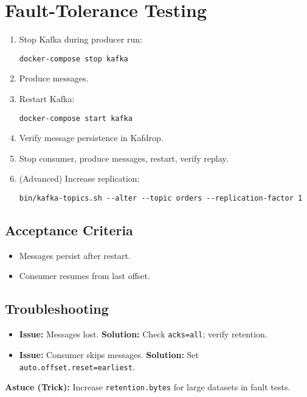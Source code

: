 \documentclass[12pt,a4paper]{report}
\begin{document}
\section{Fault-Tolerance Testing}
\begin{enumerate}
    \item Stop Kafka during producer run:
    \begin{lstlisting}
docker-compose stop kafka
    \end{lstlisting}
    \item Produce messages.
    \item Restart Kafka:
    \begin{lstlisting}
docker-compose start kafka
    \end{lstlisting}
    \item Verify message persistence in Kafdrop.
    \item Stop consumer, produce messages, restart, verify replay.
    \item (Advanced) Increase replication:
    \begin{lstlisting}
bin/kafka-topics.sh --alter --topic orders --replication-factor 1
    \end{lstlisting}
\end{enumerate}

\subsection{Acceptance Criteria}
\begin{itemize}
    \item Messages persist after restart.
    \item Consumer resumes from last offset.
\end{itemize}

\subsection{Troubleshooting}
\begin{itemize}
    \item \textbf{Issue:} Messages lost.
      \textbf{Solution:} Check \texttt{acks=all}; verify retention.
    \item \textbf{Issue:} Consumer skips messages.
      \textbf{Solution:} Set \texttt{auto.offset.reset=earliest}.
\end{itemize}

\begin{framed}
\textbf{Astuce (Trick):} Increase \texttt{retention.bytes} for large datasets in fault tests.
\end{framed}
\end{document}
